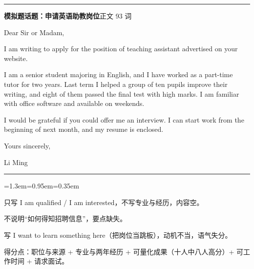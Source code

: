 \documentclass[10pt,a4paper]{ctexart}
\begin{document}
{\color{rule}\rule{\linewidth}{0.6pt}}\par\nopagebreak
\vspace{1pt}
\vspace{2pt}\noindent\colorbox{soft}{\parbox{\dimexpr\linewidth-2\fboxsep\relax}{%
\vspace{2pt}
{\footnotesize\bfseries\color{accent}模拟题话题：申请英语助教岗位}\hfill{\footnotesize\color{gray}正文 93 词}
\par\vspace{2pt}
\footnotesize Dear Sir or Madam,\par
\footnotesize I am writing to apply for the position of teaching assistant advertised on your website.\par
\footnotesize I am a senior student majoring in English, and I have worked as a part-time tutor for two years. Last term I helped a group of ten pupils improve their writing, and eight of them passed the final test with high marks. I am familiar with office software and available on weekends.\par
\footnotesize I would be grateful if you could offer me an interview. I can start work from the beginning of next month, and my resume is enclosed.\par
\footnotesize Yours sincerely,\par
\footnotesize Li Ming\par
\par{}
\par\vspace{1pt}}}\par
\vspace{2pt}
\vspace{4pt}\par\nopagebreak
{\color{rule}\rule{\linewidth}{0.6pt}}\par\nopagebreak
\vspace{1pt}
\vspace{1pt}\begingroup\setlength{\parindent}{0pt}
\begin{list}{}{\leftmargin=1.3em=0.95em=0.35em\itemindent=0pt\topsep=0pt\partopsep=0pt\parsep=1.5pt\itemsep=0pt}
\item[{\color{warn}\scriptsize$\blacksquare$}]{\footnotesize 只写 I am qualified / I am interested，不写专业与经历，内容空。}
\item[{\color{warn}\scriptsize$\blacksquare$}]{\footnotesize 不说明“如何得知招聘信息”，要点缺失。}
\item[{\color{warn}\scriptsize$\blacksquare$}]{\footnotesize 写 I want to learn something here（把岗位当跳板），动机不当，语气失分。}
\item[{\color{warn}\scriptsize$\blacksquare$}]{\footnotesize 得分点：职位与来源 + 专业与两年经历 + 可量化成果（十人中八人高分）+ 可工作时间 + 请求面试。}
\end{list}
\end{document}

